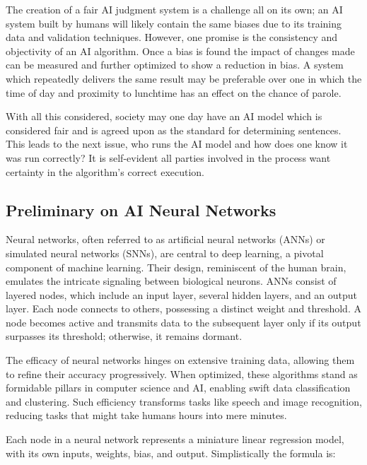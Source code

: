 \documentclass[conference]{IEEEtran}
\begin{document}
The creation of a fair AI judgment system is a challenge all on its own; an AI system built by humans will likely contain the same biases due to its training data and validation techniques.  However, one promise is the consistency and objectivity of an AI algorithm. Once a bias is found the impact of changes made can be measured and further optimized to show a reduction in bias. A system which repeatedly delivers the same result may be preferable over one in which the time of day and proximity to lunchtime has an effect on the chance of parole.

With all this considered, society may one day have an AI model which is considered fair and is agreed upon as the standard for determining sentences. This leads to the next issue, who runs the AI model and how does one know it was run correctly? It is self-evident all parties involved in the process want certainty in the algorithm's correct execution.

\subsection{Preliminary on AI Neural Networks}
Neural networks, often referred to as artificial neural networks (ANNs) or simulated neural networks (SNNs), are central to deep learning, a pivotal component of machine learning. Their design, reminiscent of the human brain, emulates the intricate signaling between biological neurons. ANNs consist of layered nodes, which include an input layer, several hidden layers, and an output layer. Each node connects to others, possessing a distinct weight and threshold. A node becomes active and transmits data to the subsequent layer only if its output surpasses its threshold; otherwise, it remains dormant.

The efficacy of neural networks hinges on extensive training data, allowing them to refine their accuracy progressively. When optimized, these algorithms stand as formidable pillars in computer science and AI, enabling swift data classification and clustering. Such efficiency transforms tasks like speech and image recognition, reducing tasks that might take humans hours into mere minutes.

Each node in a neural network represents a miniature linear regression model, with its own inputs, weights, bias, and output. Simplistically the formula is: \\
\end{document}

